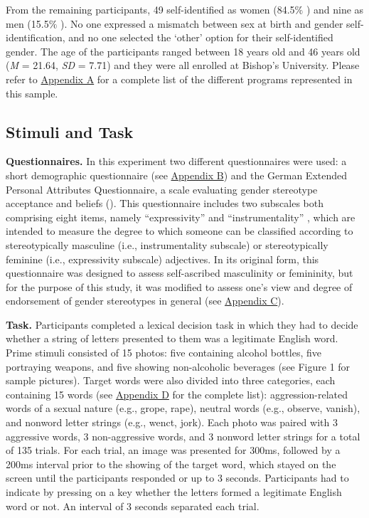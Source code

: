 \documentclass[serif, twocolumn, numeric, empirical]{jote-article}
\begin{document}
From the remaining participants, 49 self-identified as women (84.5$\%$ ) and nine as men (15.5$\%$ ). No one expressed a mismatch between sex at birth and gender self-identification, and no one selected the ‘other’ option for their self-identified gender. The age of the participants ranged between 18 years old and 46 years old (\textit{M }= 21.64, \textit{SD }= 7.71) and they were all enrolled at Bishop’s University. Please refer to \hyperlink{A}{Appendix A} for a complete list of the different programs represented in this sample.

\subsection*{Stimuli and Task}
\textbf{Questionnaires.} In this experiment two different questionnaires were used: a short demographic questionnaire (see \hyperlink{B}{Appendix B}) and the German Extended Personal Attributes Questionnaire, a scale evaluating gender stereotype acceptance and beliefs (\cite{RungeFreyGollwitzerHelmreichSpence1981}). This questionnaire includes two subscales both comprising eight items, namely ``expressivity” and ``instrumentality” , which are intended to measure the degree to which someone can be classified according to stereotypically masculine (i.e., instrumentality subscale) or stereotypically feminine (i.e., expressivity subscale) adjectives. In its original form, this questionnaire was designed to assess self-ascribed masculinity or femininity, but for the purpose of this study, it was modified to assess one’s view and degree of endorsement of gender stereotypes in general (see \hyperlink{C}{Appendix C}). 

\textbf{Task.} Participants completed a lexical decision task in which they had to decide whether a string of letters presented to them was a legitimate English word. Prime stimuli consisted of 15 photos: five containing alcohol bottles, five portraying weapons, and five showing non-alcoholic beverages (see Figure 1 for sample pictures). Target words were also divided into three categories, each containing 15 words (see \hyperlink{D}{Appendix D}  for the complete list): aggression-related words of a sexual nature (e.g., grope, rape), neutral words (e.g., observe, vanish), and nonword letter strings (e.g., wenct, jork). Each photo was paired with 3 aggressive words, 3 non-aggressive words, and 3 nonword letter strings for a total of 135 trials. For each trial, an image was presented for 300ms, followed by a 200ms interval prior to the showing of the target word, which stayed on the screen until the participants responded or up to 3 seconds. Participants had to indicate by pressing on a key whether the letters formed a legitimate English word or not. An interval of 3 seconds separated each trial.
\end{document}
